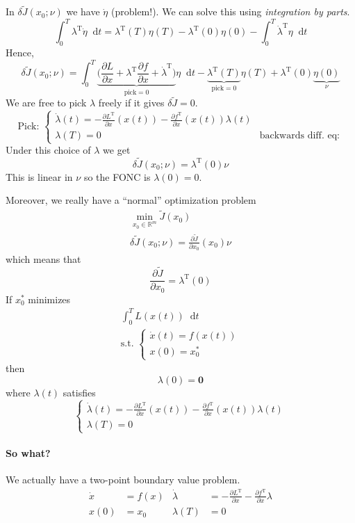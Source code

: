 \documentclass[letterpaper,12pt,titlepage]{report}
\newcommand*\dif{\mathop{}\!\mathrm{d}}
\newcommand{\trans}{^\text{T}}
\newcommand*\pder[2]{\frac{\partial #1}{\partial #2}}
\newcommand*\R{\mathbb{R}}
\theoremstyle{plain}
\theoremstyle{definition}
\begin{document}
In $\delta\tilde J(x_0;\nu)$ we have $\dot\eta$ (problem!). We can solve this using \emph{integration by parts}.
\[ \int_0^T \lambda\trans \dot\eta \dif t = \lambda\trans(T)\eta(T) - \lambda\trans(0)\eta(0) - \int_0^T \dot\lambda\trans\eta \dif t \]
Hence,
\[
  \delta\tilde J(x_0;\nu) = \int_0^T \underbrace{\big( \pder{L}{x} + \lambda\trans\pder{f}{x} + \dot\lambda\trans \big)}_{\text{pick}=0} \eta \dif t - \underbrace{\lambda\trans(T)}_{\text{pick}=0} \eta(T) + \lambda\trans(0) \underbrace{\eta(0)}_{\nu}
\]
We are free to pick $\lambda$ freely if it gives $\delta\tilde J=0$.
\[ \text{Pick: } \begin{cases}
    \dot\lambda(t) = -\pder{L\trans}{x}(x(t)) - \pder{f\trans}{x}(x(t)) \lambda(t) \\
    \lambda(T) = 0 & \text{backwards diff. eq:}
  \end{cases} \]
Under this choice of $\lambda$ we get
\[ \delta\tilde J(x_0;\nu) = \lambda\trans(0) \nu \]
This is linear in $\nu$ so the FONC is $\lambda(0)=0$.

Moreover, we really have a ``normal'' optimization problem
\begin{gather}
  \min_{x_0\in\R^m} \tilde J(x_0) \\
  \delta \tilde J(x_0;\nu) = \pder{\tilde J}{x_0} (x_0) \nu
\end{gather}
which means that
\[ \pder{\tilde J}{x_0} = \lambda\trans(0) \]
If $x_0^*$ minimizes
\begin{gather}
  \int_0^T L(x(t)) \dif t \\
  \text{s.t. } \begin{cases}
    \dot x(t) = f(x(t)) \\
    x(0) = x_0^*
  \end{cases}
\end{gather}
then
\[ \lambda(0) = \bm 0 \]
where $\lambda(t)$ satisfies
\[ \begin{cases}
    \dot \lambda(t) = -\pder{L\trans}{x}(x(t)) - \pder{f\trans}{x}(x(t)) \lambda(t) \\
    \lambda(T) = 0
  \end{cases} \]

\paragraph{So what?} We actually have a two-point boundary value problem. 
\begin{align}
  \dot x &= f(x) & \dot\lambda &= -\pder{L\trans}{x} - \pder{f\trans}{x} \lambda \\
  x(0) &= x_0 & \lambda(T) &= 0
\end{align}
\end{document}
